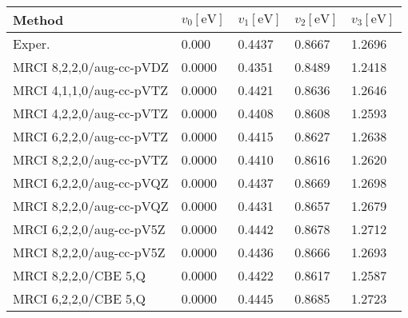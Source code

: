\begin{tabular}{lllll}
\toprule
Method & $v_0 [\mathrm{eV}]$ & $v_1 [\mathrm{eV}]$ & $v_2 [\mathrm{eV}]$ & $v_3[\mathrm{eV}]$ \\ \midrule
Exper. & 0.000 & 0.4437 & 0.8667 & 1.2696 \\
\midrule

MRCI 8,2,2,0/aug-cc-pVDZ & 0.0000 & 0.4351 & 0.8489 & 1.2418\\
MRCI 4,1,1,0/aug-cc-pVTZ & 0.0000 & 0.4421 & 0.8636 & 1.2646\\
MRCI 4,2,2,0/aug-cc-pVTZ & 0.0000 & 0.4408 & 0.8608 & 1.2593\\
MRCI 6,2,2,0/aug-cc-pVTZ & 0.0000 & 0.4415 & 0.8627 & 1.2638\\
MRCI 8,2,2,0/aug-cc-pVTZ & 0.0000 & 0.4410 & 0.8616 & 1.2620\\
MRCI 6,2,2,0/aug-cc-pVQZ & 0.0000 & 0.4437 & 0.8669 & 1.2698\\
MRCI 8,2,2,0/aug-cc-pVQZ & 0.0000 & 0.4431 & 0.8657 & 1.2679\\
MRCI 6,2,2,0/aug-cc-pV5Z & 0.0000 & 0.4442 & 0.8678 & 1.2712\\
MRCI 8,2,2,0/aug-cc-pV5Z & 0.0000 & 0.4436 & 0.8666 & 1.2693\\
MRCI 8,2,2,0/CBE 5,Q & 0.0000 & 0.4422 & 0.8617 & 1.2587\\
MRCI 6,2,2,0/CBE 5,Q & 0.0000 & 0.4445 & 0.8685 & 1.2723\\
\bottomrule
\end{tabular}
